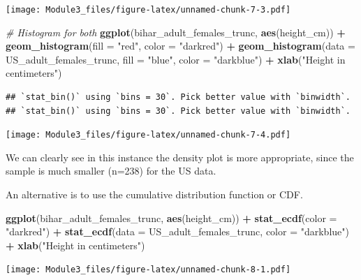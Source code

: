 \documentclass[]{book}
\newenvironment{Shaded}{\begin{snugshade}}{\end{snugshade}}
\newcommand{\KeywordTok}[1]{\textcolor[rgb]{0.13,0.29,0.53}{\textbf{#1}}}
\newcommand{\DataTypeTok}[1]{\textcolor[rgb]{0.13,0.29,0.53}{#1}}
\newcommand{\StringTok}[1]{\textcolor[rgb]{0.31,0.60,0.02}{#1}}
\newcommand{\CommentTok}[1]{\textcolor[rgb]{0.56,0.35,0.01}{\textit{#1}}}
\newcommand{\OperatorTok}[1]{\textcolor[rgb]{0.81,0.36,0.00}{\textbf{#1}}}
\newcommand{\NormalTok}[1]{#1}
\theoremstyle{definition}
\theoremstyle{definition}
\theoremstyle{definition}
\theoremstyle{remark}
\begin{document}
\texttt{[image: Module3\_files/figure-latex/unnamed-chunk-7-3.pdf]}

\begin{Shaded}
\begin{Highlighting}[]
\CommentTok{# Histogram for both}
\KeywordTok{ggplot}\NormalTok{(bihar_adult_females_trunc, }\KeywordTok{aes}\NormalTok{(height_cm)) }\OperatorTok{+}\StringTok{ }
\StringTok{  }\KeywordTok{geom_histogram}\NormalTok{(}\DataTypeTok{fill =} \StringTok{"red"}\NormalTok{, }\DataTypeTok{color =} \StringTok{"darkred"}\NormalTok{) }\OperatorTok{+}
\StringTok{  }\KeywordTok{geom_histogram}\NormalTok{(}\DataTypeTok{data =}\NormalTok{ US_adult_females_trunc, }\DataTypeTok{fill =} \StringTok{"blue"}\NormalTok{, }\DataTypeTok{color =} \StringTok{"darkblue"}\NormalTok{) }\OperatorTok{+}\StringTok{ }
\StringTok{  }\KeywordTok{xlab}\NormalTok{(}\StringTok{"Height in centimeters"}\NormalTok{)}
\end{Highlighting}
\end{Shaded}

\begin{verbatim}
## `stat_bin()` using `bins = 30`. Pick better value with `binwidth`.
## `stat_bin()` using `bins = 30`. Pick better value with `binwidth`.
\end{verbatim}

\texttt{[image: Module3\_files/figure-latex/unnamed-chunk-7-4.pdf]}

We can clearly see in this instance the density plot is more
appropriate, since the sample is much smaller (n=238) for the US data.

An alternative is to use the cumulative distribution function or CDF.

\begin{Shaded}
\begin{Highlighting}[]
\KeywordTok{ggplot}\NormalTok{(bihar_adult_females_trunc, }\KeywordTok{aes}\NormalTok{(height_cm)) }\OperatorTok{+}\StringTok{ }
\StringTok{  }\KeywordTok{stat_ecdf}\NormalTok{(}\DataTypeTok{color =} \StringTok{"darkred"}\NormalTok{) }\OperatorTok{+}
\StringTok{  }\KeywordTok{stat_ecdf}\NormalTok{(}\DataTypeTok{data =}\NormalTok{ US_adult_females_trunc, }\DataTypeTok{color =} \StringTok{"darkblue"}\NormalTok{) }\OperatorTok{+}\StringTok{ }
\StringTok{  }\KeywordTok{xlab}\NormalTok{(}\StringTok{"Height in centimeters"}\NormalTok{)}
\end{Highlighting}
\end{Shaded}

\texttt{[image: Module3\_files/figure-latex/unnamed-chunk-8-1.pdf]}
\end{document}
